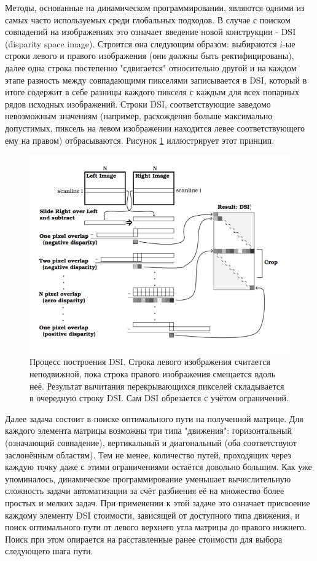 Методы, основанные на динамическом программировании, являются одними из самых часто используемых среди глобальных подходов.  
В случае с поиском совпадений на изображениях это означает введение новой конструкции - DSI (disparity space image). Строится она следующим образом: 
выбираются $i$-ые строки левого и правого изображения (они должны быть ректифицированы), далее одна строка постепенно "сдвигается" относительно другой и
на каждом этапе разность между совпадающими пикселями записывается в DSI, который в итоге содержит в себе разницы каждого пикселя с каждым для всех попарных
 рядов исходных изображений. Строки DSI, соответствующие заведомо невозможным значениям (например, расхождения больше максимально допустимых, пиксель на левом изображении 
 находится левее соответствующего ему на правом) отбрасываются. 
Рисунок \ref{pic:DSI} \cite{DSI} иллюстрирует этот принцип. 

\begin{figure}[H]
	\begin{center}
		\includegraphics[scale=0.7]{pics/DSI.png}
		\caption{Процесс построения DSI. Строка левого изображения считается неподвижной, пока строка правого изображения смещается вдоль неё. Результат вычитания 
				 перекрывающихся пикселей складывается в очередную строку DSI. Сам DSI обрезается с учётом ограничений.	} 
		\label{pic:DSI} %
	\end{center}
\end{figure}

Далее задача состоит в поиске оптимального пути на полученной матрице. Для каждого элемента матрицы возможны три типа "движения": горизонтальный (означающий совпадение),
 вертикальный и диагональный (оба соответствуют заслонённым областям). Тем не менее, количество путей, проходящих через каждую точку даже с этими ограничениями остаётся довольно большим. 
Как уже упоминалось, динамическое программирование уменьшает вычислительную сложность задачи автоматизации за счёт разбиения её на множество более простых и мелких задач. 
При применении к этой задаче это означает присвоение каждому элементу DSI стоимости, зависящей от доступного типа движения, и поиск оптимального пути от левого верхнего угла 
матрицы до правого нижнего. Поиск при этом опирается на расставленные ранее стоимости для выбора следующего шага пути. 


